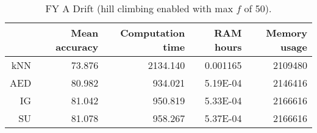 \begin{table}[h]
\centering
\begin{tabular}{r|rrrr}
    & Mean accuracy & Computation time & RAM hours & Memory usage \\ \hline
kNN & 73.876                   & 2134.140         & 0.001165  & 2109480      \\
AED & 80.982                   & 934.021          & 5.19E-04  & 2146416      \\
IG  & 81.042                   & 950.819          & 5.33E-04  & 2166616      \\
SU  & 81.078                   & 958.267          & 5.37E-04  & 2166616     
\end{tabular}
\caption{FY A Drift (hill climbing enabled with max $f$ of 50).}
\label{Table:FY_A_Drift_H}
\end{table}